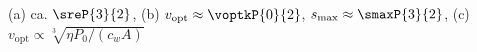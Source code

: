 (a) ca. $\sreP{3}{2}$, (b) $v_\mathrm{opt} \approx \voptkP{0}{2}$, $s_\mathrm{max} \approx \smaxP{3}{2}$, (c) $v_\mathrm{opt} \propto \sqrt[3]{\eta P_0/(c_w A)}$

